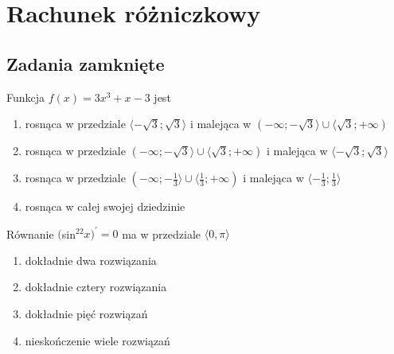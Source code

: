 \setcounter{parc}{0}
\addtocounter{chapc}{1}

\chapter{Rachunek różniczkowy}

\section{Zadania zamknięte}

\zadanie Funkcja $f(x) = 3x^3 + x - 3$ jest
\begin{enumerate}[label=\alph*)]
	\item rosnąca w przedziale $ \langle -\sqrt{3}; \sqrt{3} \rangle $ i malejąca w $ ( -\infty; -\sqrt{3} \rangle \cup \langle \sqrt{3}; +\infty ) $
	\item rosnąca w przedziale $ ( -\infty; -\sqrt{3} \rangle \cup \langle \sqrt{3}; +\infty ) $ i malejąca w $ \langle -\sqrt{3}; \sqrt{3} \rangle $
	\item rosnąca w przedziale $ ( -\infty; -\frac{1}{3} \rangle \cup \langle \frac{1}{3}; +\infty ) $ i malejąca w $ \langle -\frac{1}{3}; \frac{1}{3} \rangle $
	\item rosnąca w całej swojej dziedzinie
\end{enumerate}

\zadanie Równanie $($sin$^22x)^{'}=0$ ma w przedziale $\langle 0, \pi \rangle$
\begin{enumerate}[label=\alph*)]
	\item dokładnie dwa rozwiązania
	\item dokładnie cztery rozwiązania
	\item dokładnie pięć rozwiązań %
	\item nieskończenie wiele rozwiązań
\end{enumerate}